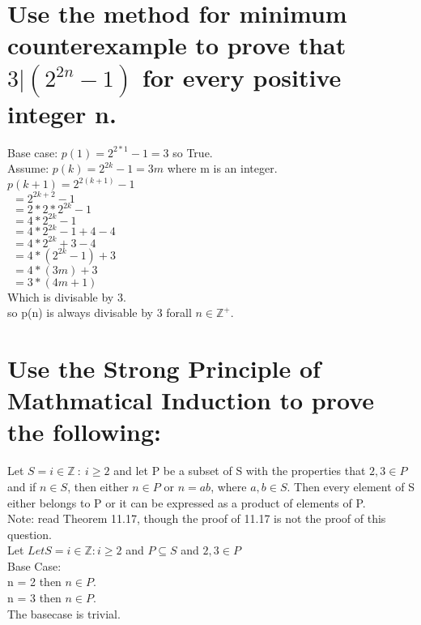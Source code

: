 \section{Use the method for minimum counterexample to prove that $3|(2^{2n}-1)$ for every positive integer n.}
Base case: $p(1) = 2^{2*1}-1 = 3$ so True.\\
Assume: $p(k) = 2^{2k}-1 = 3m$ where m is an integer.\\

$p(k+1) = 2^{2(k+1)}-1$\\
$\ \  = 2^{2k+2}-1$\\
$\ \  = 2*2*2^{2k}-1$\\
$\ \  = 4*2^{2k}-1$\\
$\ \  = 4*2^{2k}-1+4-4$\\
$\ \  = 4*2^{2k}+3-4$\\
$\ \  = 4*(2^{2k}-1)+3$\\
$\ \  = 4*(3m)+3$\\
$\ \  = 3*(4m+1)$\\
Which is divisable by 3.\\
so p(n) is always divisable by 3 forall $n\in \mathbb{Z}^{+}$.{\Huge\Bat}

\section{Use the Strong Principle of Mathmatical Induction to prove the following:}
Let $S={i\in \mathbb{Z}\ : \ i\geq 2}$ and let P be a subset of S with the properties that 
$2 , 3 \in P$ and if 
$n\in S$, then either 
$n\in P$ or 
$n=ab$, where 
$a,b\in S$.
Then every element of S either belongs to P or it can be expressed as a product of elements of P.\\
Note: read Theorem 11.17, though the proof of 11.17 is not the proof of this question.
\ \\
Let $Let S = {i\in \mathbb{Z} : i\geq 2}$ and $P\subseteq S$ and $2,3 \in P$\\

Base Case:\\
n = 2 then $n\in P$.\\
n = 3 then $n\in P$.\\
The basecase is trivial.\\


